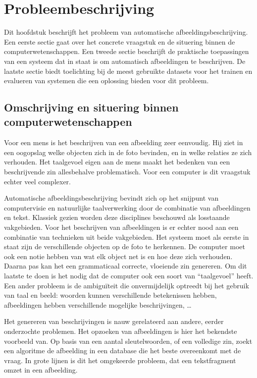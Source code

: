 \chapter{Probleembeschrijving}
\label{chap:Probleembeschrijving}
Dit hoofdstuk beschrijft het probleem van automatische afbeeldingsbeschrijving. Een eerste sectie gaat over het concrete vraagstuk en de situering binnen de computerwetenschappen. Een tweede sectie beschrijft de praktische toepassingen van een systeem dat in staat is om automatisch afbeeldingen te beschrijven. De laatste sectie biedt toelichting bij de meest gebruikte datasets voor het trainen en evalueren van systemen die een oplossing bieden voor dit probleem.

\section{Omschrijving en situering binnen computerwetenschappen}
\label{sec:Omschrijving en situering}
Voor een mens is het beschrijven van een afbeelding zeer eenvoudig. Hij ziet in een oogopslag welke objecten zich in de foto bevinden, en in welke relaties ze zich verhouden. Het taalgevoel eigen aan de mens maakt het bedenken van een beschrijvende zin allesbehalve problematisch.
Voor een computer is dit vraagstuk echter veel complexer.

Automatische afbeeldingsbeschrijving bevindt zich op het snijpunt van computervisie en natuurlijke taalverwerking door de combinatie van afbeeldingen en tekst. Klassiek gezien worden deze disciplines beschouwd als losstaande vakgebieden. Voor het beschrijven van afbeeldingen is er echter nood aan een combinatie van technieken uit beide vakgebieden. Het systeem moet als eerste in staat zijn de verschillende objecten op de foto te herkennen. De computer moet ook een notie hebben van wat elk object net is en hoe deze zich verhouden. Daarna pas kan het een grammaticaal correcte, vloeiende zin genereren. Om dit laatste te doen is het nodig dat de computer ook een soort van ``taalgevoel'' heeft. Een ander probleem is de ambigu\"iteit die onvermijdelijk optreedt bij het gebruik van taal en beeld: woorden kunnen verschillende betekenissen hebben, afbeeldingen hebben verschillende mogelijke beschrijvingen, \ldots

Het genereren van beschrijvingen is nauw gerelateerd aan andere, eerder onderzochte problemen. Het opzoeken van afbeeldingen is hier het bekendste voorbeeld van. Op basis van een aantal sleutelwoorden, of een volledige zin, zoekt een algoritme de afbeelding in een database die het beste overeenkomt met de vraag. In grote lijnen is dit het omgekeerde probleem, dat een tekstfragment omzet in een afbeelding.

